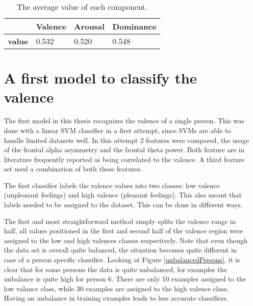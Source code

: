 \begin{table}[H]
\centering
\begin{tabular}{l|lll}
\textbf{}  & \textbf{Valence} & \textbf{Arousal} & \textbf{Dominance} \\ \hline
\textbf{value} & 0.532     	  & 0.520  			 & 0.548
\end{tabular}
\caption{The average value of each component.\label{avg-vals}}
\end{table}



\section{A first model to classify the valence}

The first model in this thesis recognizes the valence of a single person. This was done with a linear SVM classifier in a first attempt, since SVMs are able to handle limited datasets well. In this attempt 2 features were compared, the usage of the frontal alpha asymmetry and the frontal theta power. Both feature are in literature frequently reported as being correlated to the valence. A third feature set used a combination of both these features. 

\npar

The first classifier labels the valence values into two classes: low valence (unpleasant feelings) and high valence (pleasant feelings). This also meant that labels needed to be assigned to the dataset. This can be done in different ways. 

The first and most straightforward method simply splits the valence range in half, all values positioned in the first and second half of the valence region were assigned to the low and high valences classes respectively. Note that even though the data set is overall quite balanced, the situation becomes quite different in case of a person specific classifier. Looking at Figure \ref{unbalancedPersons}, it is clear that for some persons the data is quite unbalanced, for examples the unbalance is quite high for person 6. There are only 10 examples assigned to the low valance class, while 30 examples are assigned to the high valence class. Having an unbalance in training examples leads to less accurate classifiers.



